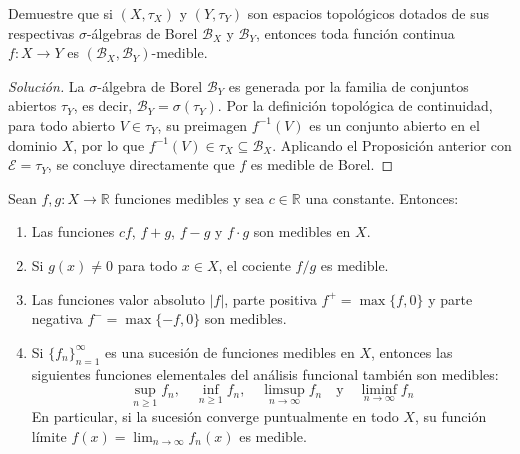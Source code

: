 \begin{ejercicio}
	Demuestre que si $(X, \tau_X)$ y $(Y, \tau_Y)$ son espacios topológicos dotados de sus respectivas $\sigma$-álgebras de Borel $\mathcal{B}_X$ y $\mathcal{B}_Y$, entonces toda función continua $f: X \to Y$ es $(\mathcal{B}_X, \mathcal{B}_Y)$-medible.
\end{ejercicio}
\begin{proof}[Solución]
	La $\sigma$-álgebra de Borel $\mathcal{B}_Y$ es generada por la familia de conjuntos abiertos $\tau_Y$, es decir, $\mathcal{B}_Y = \sigma(\tau_Y)$. 
	Por la definición topológica de continuidad, para todo abierto $V \in \tau_Y$, su preimagen $f^{-1}(V)$ es un conjunto abierto en el dominio $X$, por lo que $f^{-1}(V) \in \tau_X \subseteq \mathcal{B}_X$.
	Aplicando el Proposición anterior con $\mathcal{E} = \tau_Y$, se concluye directamente que $f$ es medible de Borel.
\end{proof}

\begin{teorema}
	Sean $f, g: X \to \mathbb{R}$ funciones medibles y sea $c \in \mathbb{R}$ una constante. Entonces:
	\begin{enumerate}[1)]
		\item Las funciones $cf$, $f + g$, $f - g$ y $f \cdot g$ son medibles en $X$.
		\item Si $g(x) \neq 0$ para todo $x \in X$, el cociente $f/g$ es medible.
		\item Las funciones valor absoluto $|f|$, parte positiva $f^+ = \max\{f, 0\}$ y parte negativa $f^- = \max\{-f, 0\}$ son medibles.
		\item Si $\{f_n\}_{n=1}^\infty$ es una sucesión de funciones medibles en $X$, entonces las siguientes funciones elementales del análisis funcional también son medibles:
		$$ \sup_{n \ge 1} f_n, \quad \inf_{n \ge 1} f_n, \quad \limsup_{n \to \infty} f_n \quad \text{y} \quad \liminf_{n \to \infty} f_n $$
		En particular, si la sucesión converge puntualmente en todo $X$, su función límite $f(x) = \lim_{n \to \infty} f_n(x)$ es medible.
	\end{enumerate}
\end{teorema}


